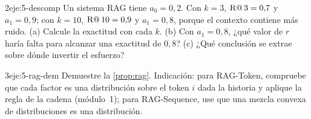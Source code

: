 \begin{ejercicio}{2}{eje:5-descomp}
Un sistema RAG tiene $a_0=0{,}2$. Con $k=3$, $\operatorname{R@}3=0{,}7$ y $a_1=0{,}9$; con $k=10$, $\operatorname{R@}10=0{,}9$ y $a_1=0{,}8$, porque el contexto contiene más ruido. (a) Calcule la exactitud con cada $k$. (b) Con $a_1=0{,}8$, ¿qué valor de $r$ haría falta para alcanzar una exactitud de $0{,}8$? (c) ¿Qué conclusión se extrae sobre dónde invertir el esfuerzo?
\end{ejercicio}

\begin{ejercicio}{3}{eje:5-rag-dem}
Demuestre la \cref{prop:rag}. Indicación: para RAG-Token, compruebe que cada factor es una distribución sobre el token $i$ dada la historia y aplique la regla de la cadena (módulo~1); para RAG-Sequence, use que una mezcla convexa de distribuciones es una distribución.
\end{ejercicio}
